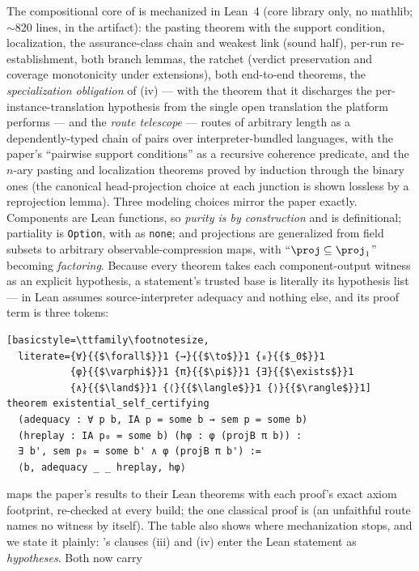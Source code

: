 The compositional core of  is
mechanized in Lean~4 (core library only, no mathlib; $\sim$820 lines,
in the artifact): the pasting theorem with the support condition,
localization, the assurance-class chain and weakest link (sound half),
per-run re-establishment, both branch lemmas, the ratchet (verdict
preservation and coverage monotonicity under extensions), both
end-to-end theorems, the \emph{specialization obligation} of
(iv) --- with the theorem that it discharges the
per-instance-translation hypothesis from the single open translation
the platform performs --- and the \emph{route telescope} --- routes of
arbitrary length as a dependently-typed chain of pairs over
interpreter-bundled languages, with the paper's ``pairwise support
conditions'' as a recursive coherence predicate, and the $n$-ary
pasting and localization theorems proved by induction through the
binary ones (the canonical head-projection choice at each junction is
shown lossless by a reprojection lemma). Three modeling
choices mirror the paper exactly. Components are Lean functions, so
\emph{purity is by construction} and  is
definitional; partiality is \texttt{Option}, with \unsupported{} as
\texttt{none}; and projections are generalized from field subsets to
arbitrary observable-compression maps, with ``$\proj \subseteq
\proj_1$'' becoming \emph{factoring}. Because every theorem takes each
component-output witness as an explicit hypothesis, a statement's
trusted base is literally its hypothesis list ---
 in Lean assumes source-interpreter adequacy and
nothing else, and its proof term is three tokens:
\begin{lstlisting}[basicstyle=\ttfamily\footnotesize,
  literate={∀}{{$\forall$}}1 {→}{{$\to$}}1 {₀}{{$_0$}}1
           {φ}{{$\varphi$}}1 {π}{{$\pi$}}1 {∃}{{$\exists$}}1
           {∧}{{$\land$}}1 {⟨}{{$\langle$}}1 {⟩}{{$\rangle$}}1]
theorem existential_self_certifying
  (adequacy : ∀ p b, IA p = some b → sem p = some b)
  (hreplay : IA p₀ = some b) (hφ : φ (projB π b)) :
  ∃ b', sem p₀ = some b' ∧ φ (projB π b') :=
  ⟨b, adequacy _ _ hreplay, hφ⟩
\end{lstlisting}
 maps the paper's results to their Lean theorems with
each proof's exact axiom footprint, re-checked at every build; the one
classical proof is  (an unfaithful route names
no witness by itself). The table also shows where mechanization stops,
and we state it plainly: 's clauses (iii) and (iv)
enter the Lean statement as \emph{hypotheses}. Both now carry
